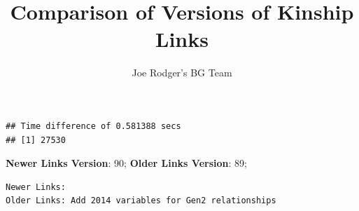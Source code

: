\documentclass[a4paper]{article}\usepackage[]{graphicx}\usepackage[]{color}
\title{Comparison of Versions of Kinship Links}
\author{Joe Rodger's BG Team}
\makeatletter
\newenvironment{kframe}{%
 \def\at@end@of@kframe{}%
 \ifinner\ifhmode%
  \def\at@end@of@kframe{\end{minipage}}%
  \begin{minipage}{\columnwidth}%
 \fi\fi%
 \def\FrameCommand##1{\hskip\@totalleftmargin \hskip-\fboxsep
 \colorbox{shadecolor}{##1}\hskip-\fboxsep
     \hskip-\linewidth \hskip-\@totalleftmargin \hskip\columnwidth}%
 \MakeFramed {\advance\hsize-\width
   \@totalleftmargin\z@ \linewidth\hsize
   \@setminipage}}%
 {\par\unskip\endMakeFramed%
 \at@end@of@kframe}
\newenvironment{knitrout}{}{} %
\makeatother
\begin{document}
\maketitle

\setlength{\parindent}{0pt}%
















\begin{knitrout}
\color{fgcolor}\begin{kframe}
\begin{verbatim}
## Time difference of 0.581388 secs
## [1] 27530
\end{verbatim}
\end{kframe}
\end{knitrout}



\textbf{Newer Links Version}: 90;
\textbf{Older Links Version}: 89;




\begin{knitrout}
\color{fgcolor}\begin{kframe}
\begin{verbatim}
Newer Links:
Older Links: Add 2014 variables for Gen2 relationships
\end{verbatim}
\end{kframe}
\end{knitrout}
\end{document}
